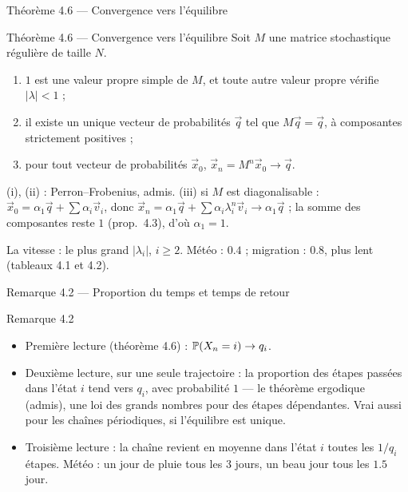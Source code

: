 \begin{frame}{Théorème 4.6 --- Convergence vers l'équilibre}
  \begin{Enonce}{Théorème 4.6 --- Convergence vers l'équilibre}
    \small Soit $M$ une matrice stochastique régulière de taille $N$.
    \begin{enumerate}
      \item[(i)] $1$ est une valeur propre simple de $M$, et toute autre
        valeur propre vérifie $|\lambda|<1$ ;
      \item[(ii)] il existe un unique vecteur de probabilités $\vec q$ tel
        que $M\vec q=\vec q$, à composantes strictement positives ;
      \item[(iii)] pour tout vecteur de probabilités $\vec x_0$,
        $\vec x_n=M^n\vec x_0\to\vec q$.
    \end{enumerate}
  \end{Enonce}
  \begin{AuTableau}
    \footnotesize (i), (ii) : Perron--Frobenius, admis. (iii) si $M$ est
    diagonalisable : $\vec x_0=\alpha_1\vec q+\sum\alpha_i\vec v_i$, donc
    $\vec x_n=\alpha_1\vec q+\sum\alpha_i\lambda_i^n\vec v_i\to\alpha_1\vec q$ ;
    la somme des composantes reste $1$ (prop.~4.3), d'où $\alpha_1=1$.
  \end{AuTableau}
  \small La vitesse : le plus grand $|\lambda_i|$, $i\geq2$. Météo :
  $\num{0.4}$ ; migration : $\num{0.8}$, plus lent (tableaux 4.1 et 4.2).
\end{frame}

\begin{frame}{Remarque 4.2 --- Proportion du temps et temps de retour}
  \begin{Rem}{Remarque 4.2}
    \small
    \begin{itemize}
      \item Première lecture (théorème 4.6) : $\P{X_n=i}\to q_i$.
      \item Deuxième lecture, sur une seule trajectoire : la proportion
        des étapes passées dans l'état $i$ tend vers $q_i$, avec
        probabilité $1$ --- le théorème ergodique (admis), une loi des
        grands nombres pour des étapes dépendantes. Vrai aussi pour les
        chaînes périodiques, si l'équilibre est unique.
      \item Troisième lecture : la chaîne revient en moyenne dans
        l'état $i$ toutes les $1/q_i$ étapes. Météo : un jour de pluie
        tous les $3$ jours, un beau jour tous les $\num{1.5}$ jour.
    \end{itemize}
  \end{Rem}
\end{frame}

